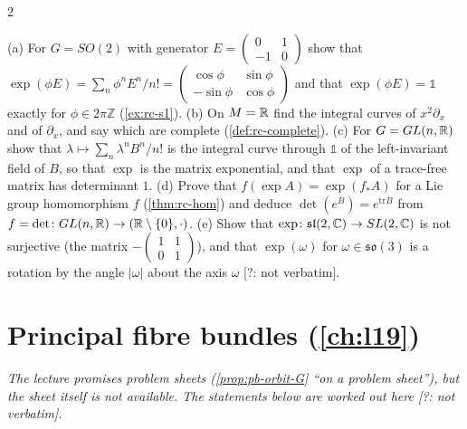 \begin{paracol}{2}
\begin{exercise}\label{ex:rc-full}
(a) For $G=SO(2)$ with generator $E=\begin{pmatrix}0&1\\-1&0\end{pmatrix}$ show that $\exp(\phi E)=\sum_n\phi^nE^n/n!=\begin{pmatrix}\cos\phi&\sin\phi\\-\sin\phi&\cos\phi\end{pmatrix}$ and that $\exp(\phi E)=\mathbb 1$ exactly for $\phi\in2\pi\mathbb Z$ (\cref{ex:rc-s1}). (b) On $M=\mathbb{R}$ find the integral curves of $x^2\partial_x$ and of $\partial_x$, and say which are complete (\cref{def:rc-complete}). (c) For $G=GL(n,\mathbb{R})$ show that $\lambda\mapsto\sum_n\lambda^nB^n/n!$ is the integral curve through $\mathbb 1$ of the left-invariant field of $B$, so that $\exp$ is the matrix exponential, and that $\exp$ of a trace-free matrix has determinant $1$. (d) Prove that $f(\exp A)=\exp(f_*A)$ for a Lie group homomorphism $f$ (\cref{thm:rc-hom}) and deduce $\det(e^B)=e^{\mathrm{tr}B}$ from $f=\det\colon GL(n,\mathbb{R})\to(\mathbb{R}\setminus\{0\},\cdot)$. (e) Show that $\exp\colon\mathfrak{sl}(2,\mathbb{C})\to SL(2,\mathbb{C})$ is not surjective (the matrix $-\begin{pmatrix}1&1\\0&1\end{pmatrix}$), and that $\exp(\omega)$ for $\omega\in\mathfrak{so}(3)$ is a rotation by the angle $|\omega|$ about the axis $\omega$ [?: not verbatim].
\end{exercise}

\section{Principal fibre bundles (\cref{ch:l19})}\label{exam:ch19}

\emph{The lecture promises problem sheets (\cref{prop:pb-orbit-G} ``on a problem sheet''), but the sheet itself is not available. The statements below are worked out here [?: not verbatim].}


\end{paracol}
